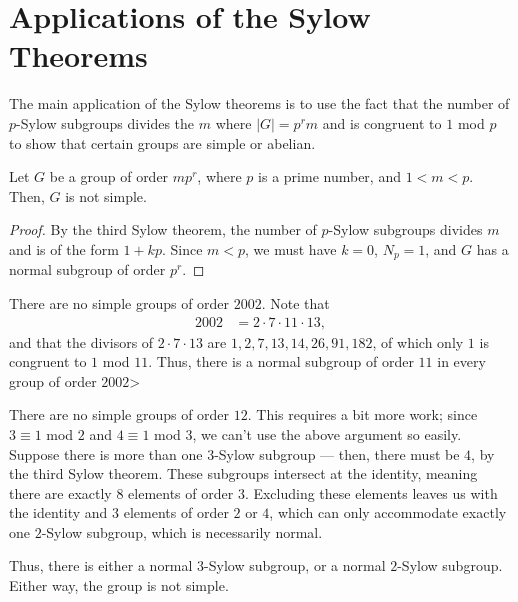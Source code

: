 \documentclass[10pt]{mypackage}
\begin{document}
\section{Applications of the Sylow Theorems}%
The main application of the Sylow theorems is to use the fact that the number of $p$-Sylow subgroups divides the $m$ where $\left\vert G \right\vert = p^{r}m$ and is congruent to $1$ mod $p$ to show that certain groups are simple or abelian.
\begin{claim}
  Let $G$ be a group of order $mp^{r}$, where $p$ is a prime number, and $1 < m < p$. Then, $G$ is not simple.
\end{claim}
\begin{proof}
  By the third Sylow theorem, the number of $p$-Sylow subgroups divides $m$ and is of the form $1 + kp$. Since $m < p$, we must have $k = 0$, $N_p = 1$, and $G$ has a normal subgroup of order $p^{r}$.
\end{proof}
\begin{example}
  There are no simple groups of order $2002$. Note that
  \begin{align*}
    2002 &= 2\cdot 7 \cdot 11 \cdot 13,
  \end{align*}
  and that the divisors of $2\cdot 7 \cdot 13$ are $1,2,7,13,14,26,91,182$, of which only $1$ is congruent to $1$ mod $11$. Thus, there is a normal subgroup of order $11$ in every group of order $2002$>
\end{example}
\begin{example}
  There are no simple groups of order $12$. This requires a bit more work; since $3\equiv 1$ mod $2$ and $4\equiv 1$ mod $3$, we can't use the above argument so easily. Suppose there is more than one $3$-Sylow subgroup --- then, there must be $4$, by the third Sylow theorem. These subgroups intersect at the identity, meaning there are exactly $8$ elements of order $3$. Excluding these elements leaves us with the identity and $3$ elements of order $2$ or $4$, which can only accommodate exactly one $2$-Sylow subgroup, which is necessarily normal.\newline

  Thus, there is either a normal $3$-Sylow subgroup, or a normal $2$-Sylow subgroup. Either way, the group is not simple.
\end{example}
\end{document}

